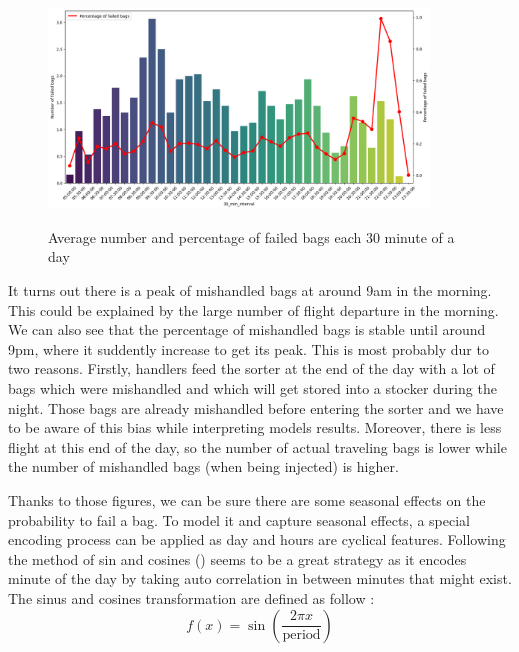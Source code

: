 \documentclass[12pt]{article}
\begin{document}
\begin{figure}[h]
    \centering
    \includegraphics[width=0.9\textwidth]{Number and percentage of failed bags within a day.png}\\
    \caption{Average number and percentage of failed bags each 30 minute of a day}
    \label{fig:Average number and percentage of failed bags each 30 minute of a day}
\end{figure}
\FloatBarrier

It turns out there is a peak of mishandled bags at around 9am in the morning. This could be explained by the large number of flight departure in the morning. We can also see that the percentage of mishandled bags is stable until around 9pm, where it suddently increase to get its peak. This is most probably dur to two reasons. Firstly, handlers feed the sorter at the end of the day with a lot of bags which were mishandled and which will get stored into a stocker during the night. Those bags are already mishandled before entering the sorter and we have to be aware of this bias while interpreting models results. Moreover, there is less flight at this end of the day, so the number of actual traveling bags is lower while the number of mishandled bags (when being injected) is higher.

\indent Thanks to those figures, we can be sure there are some seasonal effects on the probability to fail a bag. To model it and capture seasonal effects, a special encoding process can be applied as day and hours are cyclical features. Following the method of sin and cosines (\cite{HarrisonPim}) seems to be a great strategy as it encodes minute of the day by taking auto correlation in between minutes that might exist.
\noindent The sinus and cosines transformation are defined as follow : 
\begin{equation}
f(x) = \sin\left(\frac{2\pi x}{\text{period}}\right)
\end{equation}
\end{document}
